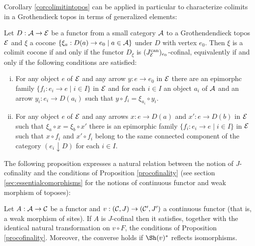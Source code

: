 \documentclass[a4paper,12pt]{article}
\begin{document}
Corollary \ref{corcolimitintopos} can be applied in particular to characterize colimits in a Grothendieck topos in terms of generalized elements:

\begin{corollary}
	Let $D:{\cal A}\to {\cal E}$ be a functor from a small category $\cal A$ to a Grothendendieck topos $\cal E$ and $\xi$ a cocone $\{\xi_{a}: D(a)\to e_{0} \mid a\in {\cal A}\}$ under $D$ with vertex $e_{0}$. Then $\xi$ is a colimit cocone if and only if the functor $D_{\xi}$ is $({J^{\textup{can}}_{\cal E}})_{e_{0}}$-cofinal, equivalently if and only if the following conditions are satisfied:
	\begin{enumerate}[(i)]
		\item For any object $e$ of $\cal E$ and any arrow $y:e\to e_{0}$ in $\cal E$ there are an epimorphc family $\{f_i: e_i \to e \mid i\in I\}$ in $\cal E$ and for each $i\in I$ an object $a_{i}$ of $\cal A$ and an arrow $y_i:e_{i}\to D(a_{i})$ such that $y\circ f_{i}=\xi_{a_{i}}\circ y_{i}$.
		
		\item For any object $e$ of $\cal E$ and any arrows $x:e\to D(a)$ and $x':e\to D(b)$ in $\cal E$ such that $\xi_{a}\circ x= \xi_{b}\circ x'$ there is an epimorphic family $\{f_i: e_i \to e \mid i\in I\}$ in $\cal E$ such that $x\circ f_i$ and $x'\circ f_i$ belong to the same connected component of the category $(e_{i} \downarrow D)$ for each $i\in I$. 
	\end{enumerate}		
\end{corollary} 

The following proposition expresses a natural relation between the notion of $J$-cofinality and the conditions of Proposition \ref{procofinality} (see section \ref{sec:essentialcomorphisms} for the notions of continuous functor and weak morphism of toposes):

\begin{proposition}\label{propcontinuitycofinality}
	Let $A:{\cal A}\to {\cal C}$ be a functor and $v:({\cal C}, J)\to ({\cal C}', J')$ a continuous functor (that is, a weak morphism of sites). If $A$ is $J$-cofinal then it satisfies, together with the identical natural transformation on $v\circ F$, the conditions of Proposition \ref{procofinality}. Moreover, the converse holds if $\Sh(v)^{\ast}$ reflects isomorphisms.  
\end{proposition}
\end{document}

